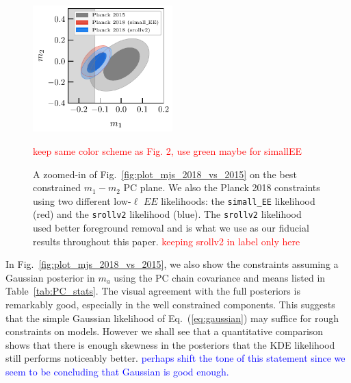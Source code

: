 \documentclass[prd,twocolumn,amsmath,amssymb,floatfix,superscriptaddress,nofootinbib]{revtex4-1}
\newcommand{\wh}[1]{\textcolor{blue}{#1}}
\newcommand{\ch}[1]{\textcolor{red}{#1}}
\begin{document}
\begin{figure}
\includegraphics[width=0.48\textwidth]{plots/plot_m1_m2_t18_r12_t19_t20_vs_pl18_pc_zmax30_pliklite_0930_vs_pl18_pc_zmax30_pliklite_srollv2_1015.pdf}
\caption{A zoomed-in of Fig.~\ref{fig:plot_mjs_2018_vs_2015} on the best constrained $m_1-m_2$ PC plane. We also 
the Planck 2018 constraints using two different low-$\ell$ $EE$ likelihoods: the \texttt{simall\_EE} likelihood (red) and the \texttt{srollv2} likelihood (blue). The \texttt{srollv2} likelihood used better foreground removal and is what we use as our fiducial results throughout this paper. 
\ch{keeping srollv2 in label only here}
} \ch{keep same color scheme as Fig. 2, use green maybe for simallEE}
\label{fig:plot_m1m2_2015_vs_2018}
\end{figure}



In Fig.~\ref{fig:plot_mjs_2018_vs_2015}, we also show the constraints assuming a Gaussian posterior in $m_a$ using the PC chain covariance and means listed in Table~\ref{tab:PC_stats}.  The visual agreement with the full posteriors is remarkably good, especially in the well constrained components.  This suggests that the simple Gaussian  likelihood of Eq.~(\ref{eq:gaussian}) may suffice for rough constraints on models.    However we shall see that a quantitative comparison shows that there is enough skewness in the posteriors that the KDE likelihood 
still performs noticeably better.  \wh{perhaps shift the tone of this statement since we seem to be concluding that Gaussian is good enough.}




\end{document}
